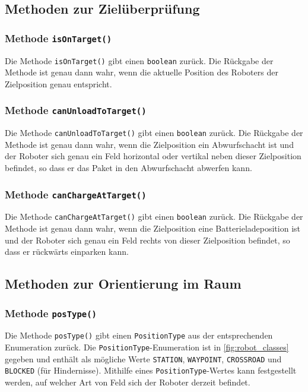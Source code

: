\enlargethispage{2\baselineskip}

\subsection*{Methoden zur Zielüberprüfung}


\subsubsection{Methode \texttt{isOnTarget()}}
\label{method:ontarget}

Die Methode \texttt{isOnTarget()} gibt einen \texttt{boolean} zurück. 
Die Rückgabe der Methode ist genau dann wahr, wenn die aktuelle Position des Roboters der Zielposition genau entspricht.


\subsubsection{Methode \texttt{canUnloadToTarget()}}
\label{method:nexttounload}

Die Methode \texttt{canUnloadToTarget()} gibt einen \texttt{boolean} zurück. 
Die Rückgabe der Methode ist genau dann wahr, wenn die Zielposition ein Abwurfschacht ist und der Roboter sich genau ein Feld horizontal oder vertikal neben dieser Zielposition befindet, so dass er das Paket in den Abwurfschacht abwerfen kann.


\subsubsection{Methode \texttt{canChargeAtTarget()}}
\label{method:nexttocharger}

Die Methode \texttt{canChargeAtTarget()} gibt einen \texttt{boolean} zurück. 
Die Rückgabe der Methode ist genau dann wahr, wenn die Zielposition eine Batterieladeposition ist und der Roboter sich genau ein Feld rechts von dieser Zielposition befindet, so dass er rückwärts einparken kann.


\subsection*{Methoden zur Orientierung im Raum}


\subsubsection{Methode \texttt{posType()}}

Die Methode \texttt{posType()} gibt einen \texttt{PositionType} aus der entsprechenden Enumeration zurück.
Die \texttt{PositionType}-Enumeration ist in \autoref{fig:robot_classes} gegeben und enthält als mögliche Werte \texttt{STATION}, \texttt{WAYPOINT}, \texttt{CROSSROAD} und \texttt{BLOCKED} (für Hindernisse).
Mithilfe eines \texttt{PositionType}-Wertes kann festgestellt werden, auf welcher Art von Feld sich der Roboter derzeit befindet. 


